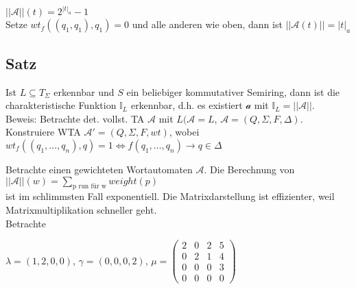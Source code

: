 \documentclass[titlepage]{article}
\begin{document}
$||\mathcal{A}||(t) = 2^{|t|_a} - 1$\\

Setze $wt_f((q_1,q_1),q_1) = 0$ und alle anderen wie oben,
dann ist $||\mathcal{A}(t)|| = |t|_a$

\subsection{Satz}

Ist $L \subseteq T_\Sigma$ erkennbar und $S$ ein beliebiger kommutativer Semiring,
dann ist die charakteristische Funktion $\mathbb{I}_L$ erkennbar, d.h. es existiert $\mathcal{a}$ mit
$\mathbb{I}_L = ||\mathcal{A}||$.\\

Beweis: Betrachte det. vollst. TA $\mathcal{A}$ mit $L(\mathcal{A} = L$,
$\mathcal{A} = (Q,\Sigma,F,\Delta)$. Konstruiere WTA $\mathcal{A}' = (Q,\Sigma,F,wt)$,
wobei $wt_f((q_1, \dots, q_n),q) = 1 \Leftrightarrow f(q_1, \dots, q_n) \to q \in \Delta$

Betrachte einen gewichteten Wortautomaten $\mathcal{A}$. Die Berechnung von
$||\mathcal{A}||(w) = \sum\limits_{\text{p run f\"ur w}} weight(p)$\\
ist im schlimmsten Fall exponentiell.
Die Matrixdarstellung ist effizienter, weil Matrixmultiplikation schneller geht.\\

Betrachte\\

$\lambda = (1,2,0,0)$, 
$\gamma = (0,0,0,2)$, 
$\mu =
\begin{pmatrix}
    2 & 0 & 2 & 5 \\
    0 & 2 & 1 & 4 \\
    0 & 0 & 0 & 3 \\
    0 & 0 & 0 & 0
\end{pmatrix}$\\
\end{document}
